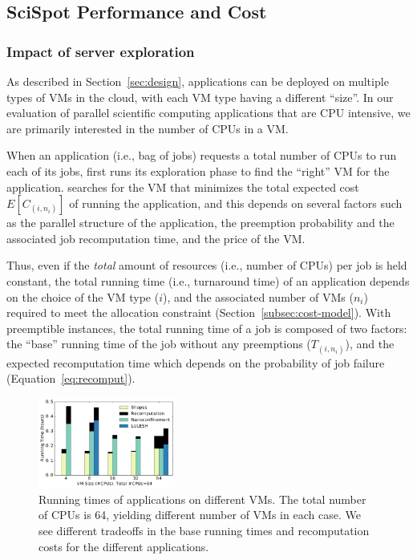 \vspace*{\subsecspace}
\subsection{SciSpot Performance and Cost}

\subsubsection{Impact of server exploration}

As described in Section~\ref{sec:design}, applications can be deployed on multiple types of VMs in the cloud, with each VM type having a different ``size''.
In our evaluation of parallel scientific computing applications that are CPU intensive, we are primarily interested in the number of CPUs in a VM.

When an application (i.e., bag of jobs) requests a total number of CPUs to run each of its jobs, \sysname first runs its exploration phase to find the ``right'' VM for the application.
\sysname searches for the VM that minimizes the total expected cost $E[C_{(i,n_i)}]$ of running the application, and this depends on several factors such as the parallel structure of the application, the preemption probability and the associated job recomputation time, and the price of the VM.

Thus, even if the \emph{total} amount of resources (i.e., number of CPUs) per job is held constant, the total running time (i.e., turnaround time) of an application depends on the choice of the VM type ($i$), and the associated number of VMs ($n_i$) required to meet the allocation constraint (Section~\ref{subsec:cost-model}).
%
With preemptible instances, the total running time of a job is composed of two factors: the ``base'' running time of the job without any preemptions ($T_{(i,n_i)}$), and the expected recomputation time which depends on the probability of job failure (Equation~\ref{eq:recomput}). 

\begin{figure}
  \centering
  \includegraphics[width=0.4\textwidth]{../graphs/runtime-bars.pdf}
      \vspace*{\myfigspace}
  \caption{Running times of applications on different VMs. The total number of CPUs is 64, yielding different number of VMs in each case. We see different tradeoffs in the base running times and recomputation costs for the different applications.}
  \label{fig:runtimes-bar}
    \vspace*{\myfigspace}
\end{figure}


